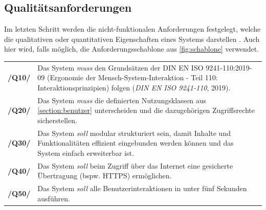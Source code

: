 \subsection*{Qualitätsanforderungen}
\label{section:qualität}
Im letzten Schritt werden die nicht-funktionalen Anforderungen festgelegt,
welche die qualitativen oder quantitativen Eigenschaften eines Systems
darstellen \cite{balzert2009}. Auch hier wird, falls möglich, die
Anforderungsschablone aus \ref{fig:schablone} verwendet.

\begin{center}
        \renewcommand{\arraystretch}{1.5}
        \begin{tabular}{p{}p{}}
                \hline
                \textbf{/Q10/} & Das System \textit{muss} den Grundsätzen der
                DIN EN ISO 9241-110:2019-09 (Ergonomie der
                Mensch-System-Interaktion - Teil 110: Interaktionsprinzipien)
                folgen (\textit{DIN EN ISO 9241-110}, 2019).                    \\
                \textbf{/Q20/} & Das System \textit{muss} die definierten
                Nutzungsklassen aus \ref{section:benutzer} unterscheiden und die
                dazugehörigen Zugriffsrechte sicherstellen.
                \\
                \textbf{/Q30/} & Das System \textit{soll} modular strukturiert
                sein, damit Inhalte und Funktionalitäten effizient eingebunden
                werden können und das System einfach erweiterbar ist.
                \\
                \textbf{/Q40/} & Das System \textit{soll} beim Zugriff über das
                Internet eine gesicherte Übertragung (bspw. \ac{HTTPS})
                ermöglichen.                                                    \\
                \textbf{/Q50/} & Das System \textit{soll} alle
                Benutzerinteraktionen in unter fünf Sekunden ausführen.
                \\
                \hline
        \end{tabular}
\end{center}
